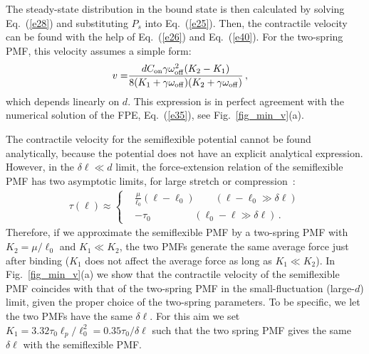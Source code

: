 \documentclass[twocolumn,prl,english]{revtex4-1}
\begin{document}
The steady-state distribution in the bound state is then calculated by solving Eq.~(\ref{e28}) and substituting  $P_s$ into Eq.~(\ref{e25}). Then, the contractile velocity can be found with the help of Eq.~(\ref{e26}) and Eq.~(\ref{e40}).  For the two-spring PMF, this velocity assumes a simple form:
\begin{align}
v=&\frac{dC_{\rm on}\gamma \omega_{\rm off}^2(K_2-K_1)}{8(K_1+\gamma \omega_{\rm off})(K_2+\gamma \omega_{\rm off})} \,,\label{e29}
\end{align}
which depends linearly on $d$. This expression is in perfect agreement with the numerical solution of the FPE, Eq.~(\ref{e35}), see Fig.~\ref{fig_min_v}(a). 

The contractile velocity for the semiflexible potential cannot be found analytically, because the potential does not have an explicit analytical expression. However, in the $\delta \ell \ll d$ limit, the force-extension relation of the semiflexible PMF has two asymptotic limits, for large stretch or compression~\cite{Broedersz2014}: 
%
\begin{equation}
\begin{aligned}
\tau(\ell)\approx
\left\{ 
\begin{aligned}
&\frac{\mu}{\ell_0}(\ell-\ell_0) \qquad (\ell-\ell_0\gg\delta\ell)\\
&-\tau_0 \qquad \qquad \,\,(\ell_0-\ell\gg\delta\ell) \, .
\end{aligned}
\right.
\end{aligned}
\label{e30}
\end{equation}
Therefore, if we approximate the semiflexible PMF by a two-spring PMF with $K_2 = \mu/\ell_0$ and $K_1\ll K_2$, the two PMFs generate the same average force  just after binding ($K_1$ does not affect the average force as long as $K_1\ll K_2$). In Fig.~\ref{fig_min_v}(a) we show that the contractile velocity of the semiflexible PMF coincides with that of the two-spring PMF in the small-fluctuation (large-$d$) limit, given the proper choice of the two-spring parameters. To be specific, we let the two PMFs have the same $\delta \ell$. For this aim we set $K_1 = 3.32\tau_0\ell_p/\ell_0^2=0.35\tau_0/\delta \ell$ such that the two spring PMF gives the same $\delta \ell$ with the semiflexible PMF. 
\end{document}
